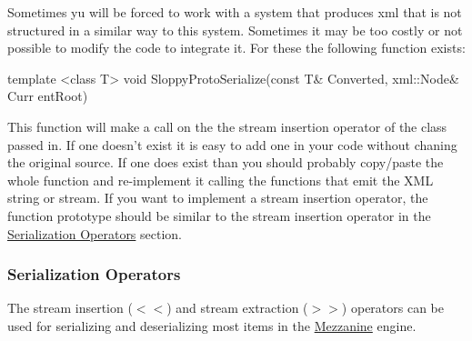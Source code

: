 Sometimes yu will be forced to work with a system that produces xml that is not structured in a similar way to this system. Sometimes it may be too costly or not possible to modify the code to integrate it. For these the following function exists: 
\begin{DoxyCode}
 template <class T> void SloppyProtoSerialize(const T& Converted, xml::Node& Curr
      entRoot)
\end{DoxyCode}
 This function will make a call on the the stream insertion operator of the class passed in. If one doesn't exist it is easy to add one in your code without chaning the original source. If one does exist than you should probably copy/paste the whole function and re-\/implement it calling the functions that emit the XML string or stream. If you want to implement a stream insertion operator, the function prototype should be similar to the stream insertion operator in the \hyperlink{Serialization_serializationoperators}{Serialization Operators} section. \hypertarget{Serialization_serializationoperators}{}\subsubsection{Serialization Operators}\label{Serialization_serializationoperators}
The stream insertion ($<$$<$) and stream extraction ($>$$>$) operators can be used for serializing and deserializing most items in the \hyperlink{namespaceMezzanine}{Mezzanine} engine.

